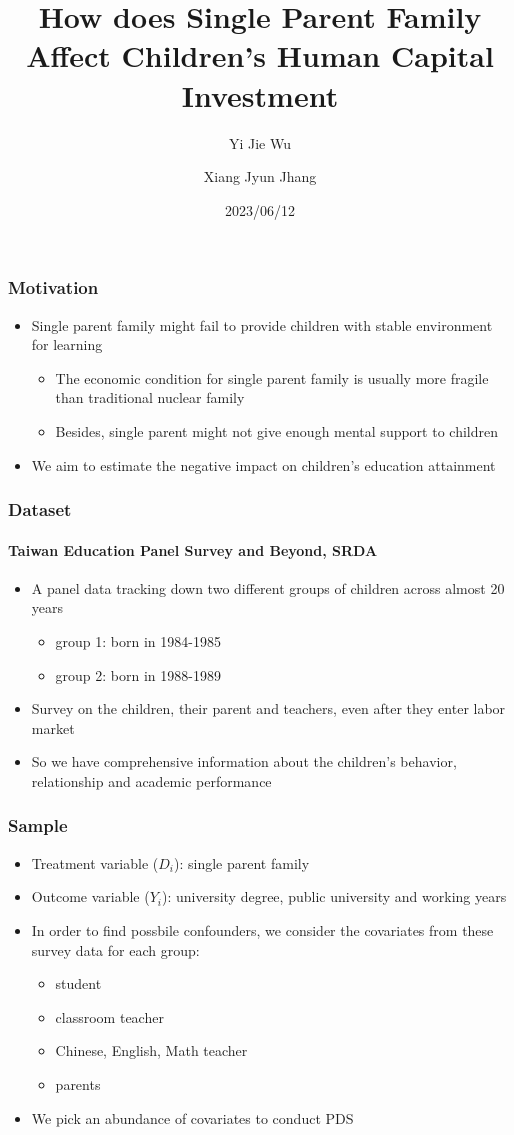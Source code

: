 \documentclass{beamer}
\title{How does Single Parent Family Affect Children's Human Capital Investment}
\author[Yi Jie Wu, Xiang Jyun Jhang]{Yi Jie Wu\inst{1} \and Xiang Jyun Jhang\inst{2}}
\institute[NTU]
{
    \inst{1}
    Department of Economics \\
    National Taiwan University
    \and
    \inst{2}
    Department of Economics \\ 
    National Taiwan University
}
\date{2023/06/12}
\begin{document}
\frame{\titlepage}


\begin{frame} %
\frametitle{Motivation}
\begin{itemize}
    \item Single parent family might fail to provide children with stable environment for learning
    \begin{itemize}
        \item The economic condition for single parent family is usually more fragile than traditional nuclear family
        \item Besides, single parent might not give enough mental support to children
    \end{itemize}
    \item We aim to estimate the negative impact on children's education attainment
\end{itemize}
\end{frame}


\begin{frame} %
\frametitle{Dataset}
\framesubtitle{Taiwan Education Panel Survey and Beyond, SRDA}
\begin{itemize}
    \item A panel data tracking down two different groups of children across almost 20 years
    \begin{itemize}
        \item group 1: born in 1984-1985
        \item group 2: born in 1988-1989
    \end{itemize}
    \item Survey on the children, their parent and teachers, even after they enter labor market
    \item So we have comprehensive information about the children's behavior, relationship and academic performance
\end{itemize}
\end{frame}


\begin{frame} %
\frametitle{Sample}
\begin{itemize}
    \item Treatment variable ($D_i$): single parent family
    \item Outcome variable ($Y_i$): university degree, public university and working years
    \item In order to find possbile confounders, we consider the covariates from these survey data for each group:
    \begin{itemize}
        \item student
        \item classroom teacher
        \item Chinese, English, Math teacher
        \item parents
    \end{itemize}
    \item We pick an abundance of covariates to conduct PDS
\end{itemize}
\end{frame}
\end{document}

